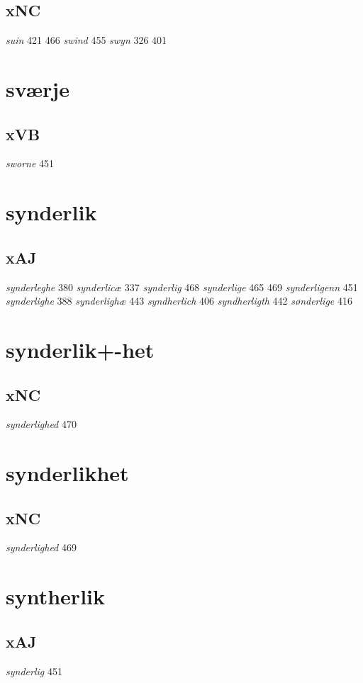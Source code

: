 \documentclass[a4paper,twocolumn]{article}
\begin{document}
\subsection{xNC}
\label{sec:orgb427987}
\emph{suin} 421 466 \emph{swind} 455 \emph{swyn} 326 401 
\section{sværje}
\label{sec:org924bc0d}
\subsection{xVB}
\label{sec:org1dca1ad}
\emph{sworne} 451 
\section{synderlik}
\label{sec:org4bb28ff}
\subsection{xAJ}
\label{sec:orgb3eb09a}
\emph{synderleghe} 380 \emph{synderlicæ} 337 \emph{synderlig} 468 \emph{synderlige} 465 469 \emph{synderligenn} 451 \emph{synderlighe} 388 \emph{synderlighæ} 443 \emph{syndherlich} 406 \emph{syndherligth} 442 \emph{sønderlige} 416 
\section{synderlik+-het}
\label{sec:org9ded618}
\subsection{xNC}
\label{sec:org3a9d8d9}
\emph{synderlighed} 470 
\section{synderlikhet}
\label{sec:orge20c156}
\subsection{xNC}
\label{sec:org993204f}
\emph{synderlighed} 469 
\section{syntherlik}
\label{sec:org478d612}
\subsection{xAJ}
\label{sec:org1bf7216}
\emph{synderlig} 451 
\end{document}
